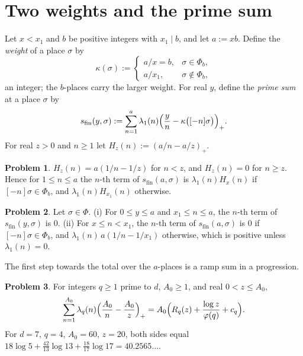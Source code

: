 \documentclass[reqno]{amsart}
\theoremstyle{definition}
\newtheorem{problem}{Problem}[section]
\theoremstyle{plain}
\begin{document}
\section{Two weights and the prime sum}\label{sec:thick}

Let \(x < x_1\) and \(b\) be positive integers with \(x_1 \mid b\), and let \(a := xb\).  Define the \emph{weight} of a place \(\sigma\) by
\[
  \kappa(\sigma) := \begin{cases} a/x = b, & \sigma \in \Phi_b, \\ a/x_1, & \sigma \notin \Phi_b, \end{cases}
\]
an integer; the \(b\)-places carry the larger weight.  For real \(y\), define the \emph{prime sum} at a place \(\sigma\) by
\[
  s_{\mathrm{fin}}(y, \sigma) := \sum_{n = 1}^{a} \lambda_1(n) \Bigl( \frac yn - \kappa\bigl([-n]\sigma\bigr) \Bigr)_+ .
\]
For real \(z > 0\) and \(n \ge 1\) let \(H_z(n) := (a/n - a/z)_+\).

\begin{problem}\label{pr:ramp}
\(H_z(n) = a(1/n - 1/z)\) for \(n < z\), and \(H_z(n) = 0\) for \(n \ge z\).  Hence for \(1 \le n \le a\) the \(n\)-th term of \(s_{\mathrm{fin}}(a, \sigma)\) is \(\lambda_1(n) H_x(n)\) if \([-n]\sigma \in \Phi_b\), and \(\lambda_1(n) H_{x_1}(n)\) otherwise.
\end{problem}

\begin{problem}\label{pr:thin}
Let \(\sigma \in \Phi\).
(i) For \(0 \le y \le a\) and \(x_1 \le n \le a\), the \(n\)-th term of \(s_{\mathrm{fin}}(y, \sigma)\) is \(0\).
(ii) For \(x \le n < x_1\), the \(n\)-th term of \(s_{\mathrm{fin}}(a, \sigma)\) is \(0\) if \([-n]\sigma \in \Phi_b\), and \(\lambda_1(n)\, a (1/n - 1/x_1)\) otherwise, which is positive unless \(\lambda_1(n) = 0\).
\end{problem}

The first step towards the total over the \(a\)-places is a ramp sum in a progression.

\begin{problem}\label{pr:ramp-sum}
For integers \(q \ge 1\) prime to \(d\), \(A_0 \ge 1\), and real \(0 < z \le A_0\),
\[
  \sum_{n = 1}^{A_0} \lambda_q(n) \Bigl( \frac{A_0}{n} - \frac{A_0}{z} \Bigr)_+ = A_0 \Bigl( R_q(z) + \frac{\log z}{\varphi(q)} + c_q \Bigr) .
\]
For \(d = 7\), \(q = 4\), \(A_0 = 60\), \(z = 20\), both sides equal \(18 \log 5 + \frac{42}{13} \log 13 + \frac{18}{17} \log 17 = 40.2565\ldots\).
\end{problem}
\end{document}
